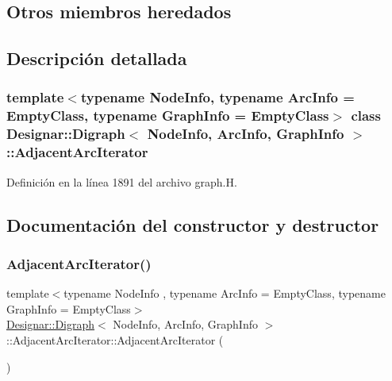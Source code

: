\subsection*{Otros miembros heredados}


\subsection{Descripción detallada}
\subsubsection*{template$<$typename Node\+Info, typename Arc\+Info = Empty\+Class, typename Graph\+Info = Empty\+Class$>$\newline
class Designar\+::\+Digraph$<$ Node\+Info, Arc\+Info, Graph\+Info $>$\+::\+Adjacent\+Arc\+Iterator}



Definición en la línea 1891 del archivo graph.\+H.



\subsection{Documentación del constructor y destructor}
\mbox{\label{class_designar_1_1_digraph_1_1_adjacent_arc_iterator_a44c04d22e04c7458517a41bced9338f6}} 
\subsubsection{\texorpdfstring{Adjacent\+Arc\+Iterator()}{AdjacentArcIterator()}\hspace{0.1cm}{\footnotesize\ttfamily [1/5]}}
{\footnotesize\ttfamily template$<$typename Node\+Info , typename Arc\+Info  = Empty\+Class, typename Graph\+Info  = Empty\+Class$>$ \\
\hyperlink{class_designar_1_1_digraph}{Designar\+::\+Digraph}$<$ Node\+Info, Arc\+Info, Graph\+Info $>$\+::Adjacent\+Arc\+Iterator\+::\+Adjacent\+Arc\+Iterator (\begin{DoxyParamCaption}{ }\end{DoxyParamCaption})\hspace{0.3cm}{\ttfamily [inline]}}



